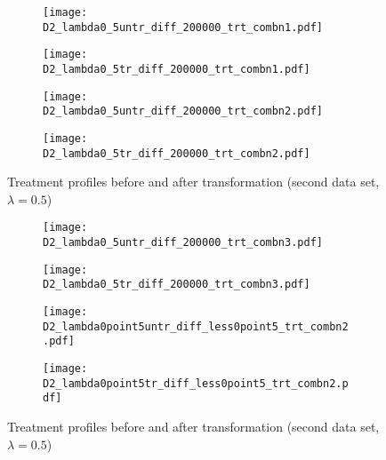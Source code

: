 \documentclass[11pt]{article}
\begin{document}
\clearpage
\begin{figure}
\begin{subfigure}{.5\textwidth}
  \centering
  \texttt{[image: D2\_lambda0\_5untr\_diff\_200000\_trt\_combn1.pdf]}
  \caption{}
  \label{data2prrofa}
\end{subfigure}%
\begin{subfigure}{.5\textwidth}
  \centering
  \texttt{[image: D2\_lambda0\_5tr\_diff\_200000\_trt\_combn1.pdf]}
  \caption{}
  \label{data2prrofb}
\end{subfigure}
\begin{subfigure}{.5\textwidth}
  \centering
  \texttt{[image: D2\_lambda0\_5untr\_diff\_200000\_trt\_combn2.pdf]}
  \caption{}
  \label{data2prrofc}
\end{subfigure}%
\begin{subfigure}{.5\textwidth}
  \centering
  \texttt{[image: D2\_lambda0\_5tr\_diff\_200000\_trt\_combn2.pdf]}
  \caption{}
  \label{data2prrofd}
\end{subfigure}
\caption{Treatment profiles before and after transformation (second data set, $\lambda = 0.5$)}
\label{data2prrof}
\end{figure}
\begin{figure}
  \ContinuedFloat 
\begin{subfigure}{.5\textwidth}
  \centering
  \texttt{[image: D2\_lambda0\_5untr\_diff\_200000\_trt\_combn3.pdf]}
  \caption{}
  \label{data2prrofe}
\end{subfigure}%
\begin{subfigure}{.5\textwidth}
  \centering
  \texttt{[image: D2\_lambda0\_5tr\_diff\_200000\_trt\_combn3.pdf]}
  \caption{}
  \label{data2prroff}
\end{subfigure}

\begin{subfigure}{.5\textwidth}
  \centering
  \texttt{[image: D2\_lambda0point5untr\_diff\_less0point5\_trt\_combn2.pdf]}
  \caption{}
  \label{data2prrofg}
\end{subfigure}%
\begin{subfigure}{.5\textwidth}
  \centering
  \texttt{[image: D2\_lambda0point5tr\_diff\_less0point5\_trt\_combn2.pdf]}
  \caption{}
  \label{data2prrofh}
\end{subfigure}
\caption{Treatment profiles before and after transformation (second data set, $\lambda = 0.5$)}
\label{data2prrof}
\end{figure}
\end{document}
